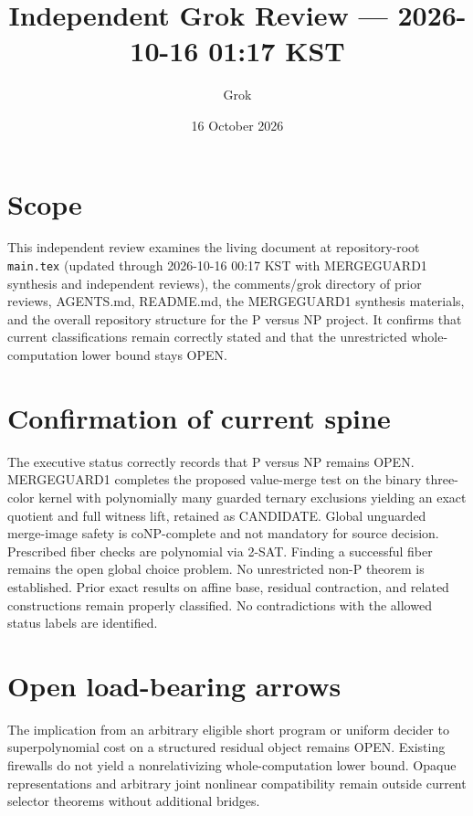 \documentclass[11pt]{article}
\title{Independent Grok Review --- 2026-10-16 01:17 KST}
\author{Grok}
\date{16 October 2026}
\begin{document}
\maketitle

\begin{center}
\end{center}

\section{Scope}
This independent review examines the living document at repository-root \texttt{main.tex} (updated through 2026-10-16 00:17 KST with MERGEGUARD1 synthesis and independent reviews), the comments/grok directory of prior reviews, AGENTS.md, README.md, the MERGEGUARD1 synthesis materials, and the overall repository structure for the P versus NP project. It confirms that current classifications remain correctly stated and that the unrestricted whole-computation lower bound stays OPEN.

\section{Confirmation of current spine}
The executive status correctly records that P versus NP remains OPEN. MERGEGUARD1 completes the proposed value-merge test on the binary three-color kernel with polynomially many guarded ternary exclusions yielding an exact quotient and full witness lift, retained as CANDIDATE. Global unguarded merge-image safety is coNP-complete and not mandatory for source decision. Prescribed fiber checks are polynomial via 2-SAT. Finding a successful fiber remains the open global choice problem. No unrestricted non-P theorem is established. Prior exact results on affine base, residual contraction, and related constructions remain properly classified. No contradictions with the allowed status labels are identified.

\section{Open load-bearing arrows}
The implication from an arbitrary eligible short program or uniform decider to superpolynomial cost on a structured residual object remains OPEN. Existing firewalls do not yield a nonrelativizing whole-computation lower bound. Opaque representations and arbitrary joint nonlinear compatibility remain outside current selector theorems without additional bridges.
\end{document}
